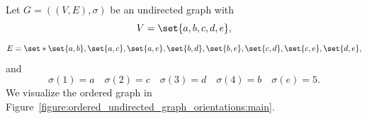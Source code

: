 Let $G = ((V, E), \sigma)$ be an undirected graph with 
\[
	V = \set{a,b,c,d,e},
\]
\[
  E = \set*{\set{a, b}, \set{a, c}, \set{a, e}, \set{b, d}, \set{b, e}, \set{c, d}, \set{c, e}, \set{d,e}},
\]
and
\[
  \sigma(1) = a \quad  \sigma(2) = c \quad \sigma(3) = d \quad \sigma(4) = b \quad \sigma(e) = 5.
\]
We visualize the ordered graph in Figure~\ref{figure:ordered_undirected_graph_orientations:main}.